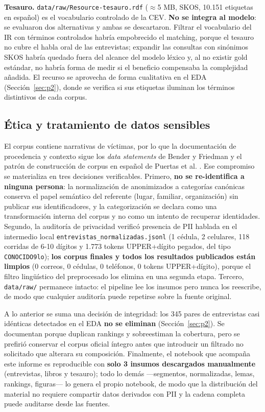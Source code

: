 \documentclass[11pt]{tg_usta}
\begin{document}
\textbf{Tesauro.} \texttt{data/raw/Resource-tesauro.rdf} ($\approx$5 MB, SKOS, 10.151 etiquetas en español) es el vocabulario controlado de la CEV. \textbf{No se integra al modelo}: se evaluaron dos alternativas y ambas se descartaron. Filtrar el vocabulario del IR con términos controlados habría empobrecido el matching, porque el tesauro no cubre el habla oral de las entrevistas; expandir las consultas con sinónimos SKOS habría quedado fuera del alcance del modelo léxico y, al no existir gold estándar, no habría forma de medir si el beneficio compensaba la complejidad añadida. El recurso se aprovecha de forma cualitativa en el EDA (Sección~\ref{sec:p2}), donde se verifica si sus etiquetas iluminan los términos distintivos de cada corpus.

\subsection{Ética y tratamiento de datos sensibles}

El corpus contiene narrativas de víctimas, por lo que la documentación de procedencia y contexto sigue los \textit{data statements} de Bender y Friedman \cite{bender2018data} y el patrón de construcción de corpus en español de Puertas et al. \cite{puertas2018automatic}. Ese compromiso se materializa en tres decisiones verificables. Primero, \textbf{no se re-identifica a ninguna persona}: la normalización de anonimizados a categorías canónicas conserva el papel semántico del referente (lugar, familiar, organización) sin publicar sus identificadores, y la categorización se declara como una transformación interna del corpus y no como un intento de recuperar identidades. Segundo, la auditoría de privacidad verificó presencia de PII hablada en el intermedio local \texttt{entrevistas\_normalizadas.jsonl} (1 cédula, 2 celulares, 118 corridas de 6-10 dígitos y 1.773 tokens UPPER+dígito pegados, del tipo \texttt{CONOCIDO9lo}); \textbf{los corpus finales y todos los resultados publicados están limpios} (0 correos, 0 cédulas, 0 teléfonos, 0 tokens UPPER+dígito), porque el filtro lingüístico del preprocesado los elimina en una segunda etapa. Tercero, \texttt{data/raw/} permanece intacto: el pipeline lee los insumos pero nunca los reescribe, de modo que cualquier auditoría puede repetirse sobre la fuente original.

A lo anterior se suma una decisión de integridad: los 345 pares de entrevistas casi idénticas detectados en el EDA \textbf{no se eliminan} (Sección~\ref{sec:p2}). Se documentan porque duplican rankings y sobreestiman la cobertura, pero se prefirió conservar el corpus oficial íntegro antes que introducir un filtrado no solicitado que alterara su composición. Finalmente, el notebook que acompaña este informe es reproducible con \textbf{solo 3 insumos descargados manualmente} (entrevistas, libros y tesauro); todo lo demás ---segmentos, normalizadas, lemas, rankings, figuras--- lo genera el propio notebook, de modo que la distribución del material no requiere compartir datos derivados con PII y la cadena completa puede auditarse desde las fuentes.
\end{document}
